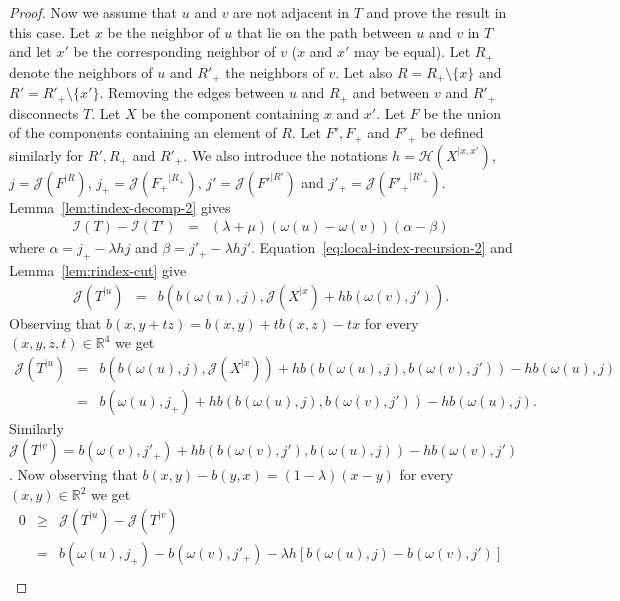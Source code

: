 \documentclass[11 pt]{modarticle}
\newcommand{\cR}{\mathbb{R}}
\newcommand{\wmap}{\omega}
\newcommand{\rtree}[2]{{#1}^{\lvert #2}}
\newcommand{\bilinear}{b}
\newcommand{\indexsymbol}{\mathcal{I}}
\newcommand{\tindex}[1]{\indexsymbol(#1)}
\newcommand{\rindexsymbol}{\mathcal{J}}
\newcommand{\rindex}[2]{\rindexsymbol(\rtree{#2}{#1})}
\newcommand{\aindexsymbol}{\mathcal{H}}
\newcommand{\aindex}[3]{\aindexsymbol(\rtree{#3}{#1, #2})}
\begin{document}
\begin{proof}
Now we assume that $u$ and $v$ are not adjacent in $T$ and prove the result in this case. Let $x$ be the neighbor of $u$ that lie on the path between $u$ and $v$ in $T$ and let $x'$ be the corresponding neighbor of $v$ ($x$ and $x'$ may be equal). Let $R_+$ denote the neighbors of $u$ and $R'_+$ the neighbors of $v$. Let also $R = R_+ \setminus \{x\}$ and $R'= R'_+ \setminus \{x'\}$. Removing the edges between $u$ and $R_+$ and between $v$ and $R'_+$ disconnects $T$. Let $X$ be the component containing $x$ and $x'$. Let $F$ be the union of the components containing an element of $R$. Let $F', F_+$ and $F'_+$ be defined similarly for $R', R_+$ and $R'_+$. We also introduce the notations $h = \aindex{x}{x'}{X}$, $j = \rindex{R}{F}$, $j_+ = \rindex{R_+}{F_+}$, $j' = \rindex{R'}{F'}$ and $j'_+ = \rindex{R'_+}{F'_+}$. Lemma~\ref{lem:tindex-decomp-2} gives
\begin{eqnarray}
	\tindex{T} - \tindex{T'} & = & (\lambda + \mu)(\wmap(u) - \wmap(v))(\alpha - \beta) \label{eq:compacity-map-proof-eq3}
\end{eqnarray}
where $\alpha = j_+ - \lambda h j$ and $\beta = j'_+ - \lambda h j'$. Equation~\eqref{eq:local-index-recursion-2} and Lemma~\ref{lem:rindex-cut} give
\begin{eqnarray*}
	\rindex{u}{T} & = & \bilinear(\bilinear(\wmap(u),j), \rindex{x}{X} + h \bilinear(\wmap(v),j')).
\end{eqnarray*}
Observing that $\bilinear(x, y + tz) = \bilinear(x,y) + t \bilinear(x,z) - tx$ for every $(x,y,z,t) \in \cR^4$ we get
\begin{eqnarray*}
	\rindex{u}{T} & = & \bilinear\left(\bilinear(\wmap(u),j), \rindex{x}{X}\right) + h \bilinear\left(\bilinear(\wmap(u),j), \bilinear(\wmap(v),j')\right) - h \bilinear(\wmap(u),j) \\
	& = & \bilinear(\wmap(u), j_+) + h \bilinear\left(\bilinear(\wmap(u),j), \bilinear(\wmap(v),j')\right) - h \bilinear(\wmap(u),j).
\end{eqnarray*}
Similarly $\rindex{v}{T} = \bilinear(\wmap(v), j'_+) + h \bilinear\left(\bilinear(\wmap(v),j'), \bilinear(\wmap(u),j)\right) - h \bilinear(\wmap(v),j')$. Now observing that $\bilinear(x, y) - \bilinear(y, x) = (1 - \lambda)(x-y)$ for every $(x, y) \in \cR^2$ we get
\begin{eqnarray}
	0 & \geq & \rindex{u}{T} - \rindex{v}{T} \nonumber \\
	& = & \bilinear(\wmap(u), j_+) - \bilinear(\wmap(v), j'_+) - \lambda h[\bilinear(\wmap(u),j) - \bilinear(\wmap(v),j')] \nonumber \\

\end{eqnarray}
\end{proof}
\end{document}
